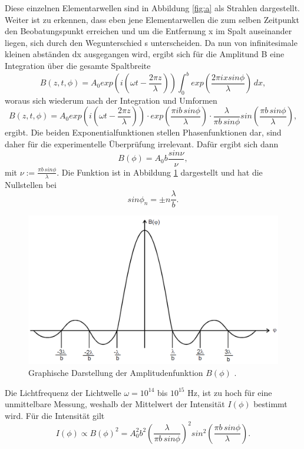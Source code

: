 Diese einzelnen Elementarwellen sind in Abbildung \ref{fig:a} als Strahlen dargestellt. Weiter ist zu erkennen, dass eben jene 
Elementarwellen die zum selben Zeitpunkt den Beobatungspunkt erreichen und um die Entfernung x im Spalt auseinander liegen, 
sich durch den Wegunterschied s unterscheiden. Da nun von infinitesimale kleinen abständen dx ausgegangen wird, ergibt sich 
für die Amplitund B eine Integration über die gesamte Spaltbreite
\begin{equation}
    \label{eq:2}
    B(z,t,\phi) = A_0 exp\left( i \left( \omega t - \frac{2 \pi z }{\lambda}\right)\right) \int_{0}^{b} exp\left(\frac{2 \pi i x sin \phi}{\lambda}\right) \,dx ,
\end{equation}
woraus sich wiederum nach der Integration und Umformen
\begin{equation}
    \label{eq:3}
    B(z,t,\phi) = A_0 exp\left(i \left(\omega t - \frac{2 \pi z}{\lambda}\right)\right) \cdot exp\left(\frac{\pi i b \, sin \phi}{\lambda}\right) \cdot \frac{\lambda}{\pi b \, sin \phi} sin\left(\frac{\pi b \, sin \phi}{\lambda}\right),
\end{equation}
ergibt.
Die beiden Exponentialfunktionen stellen Phasenfunktionen dar, sind daher für die experimentelle Überprüfung irrelevant.
Dafür ergibt sich dann 
\begin{equation}
    \label{eq:4}
    B(\phi) = A_0 b \frac{sin \nu}{\nu},
\end{equation}
mit $\nu := \frac{\pi b \, sin \phi}{\lambda}$.
Die Funktion ist in Abbildung \ref{fig:b} dargestellt und hat die Nullstellen bei 
\begin{equation}
    \label{eq:5}
    sin \phi_n = \pm n\frac{\lambda}{b}.
\end{equation}
\begin{figure}[H]
    \centering
    \includegraphics{Funktion.png}
    \caption{Graphische Darstellung der Amplitudenfunktion $B(\phi)$ \cite{V406}.}
    \label{fig:b}
\end{figure}
Die Lichtfrequenz der Lichtwelle $\omega = 10^14$ bis $10^15$ Hz, ist zu hoch für eine unmittelbare Messung, 
weshalb der Mittelwert der Intensität $I(\phi)$ bestimmt wird. Für die Intensität gilt 
\begin{equation}
    \label{eq:6}
    I(\phi) \propto B(\phi)^2 = A_0^2 b^2 \left(\frac{\lambda}{\pi b \, sin \phi}\right)^2 sin^2 \left(\frac{\pi b \, sin \phi}{\lambda}\right)  .
\end{equation}

